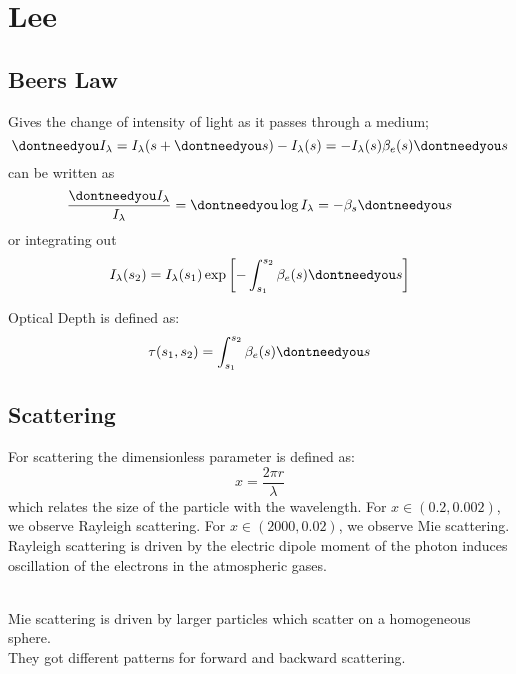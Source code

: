 \documentclass[12pt, a4paper]{article} %
\let\d\dontneedyou
\DeclareMathOperator{\d}{d}
\begin{document}
\section{Lee}

\subsection{Beers Law}

Gives the change of intensity of light as it passes through a medium;
\begin{equation*}
	\d I_\lambda = I_\lambda(s + \d s) - I_\lambda(s) = -I_\lambda(s)\beta_e(s) \d s
\end{equation*}
can be written as
\begin{equation*}
	\frac{\d I_\lambda}{I_\lambda} = \d \log I_\lambda = - \beta_s \d s
\end{equation*}
or integrating out
\begin{equation}
	I_\lambda(s_2) = I_\lambda(s_1) \exp\left[- \int_{s_1}^{s_2} \beta_e(s) \d s \right]
\end{equation}

Optical Depth is defined as:
\begin{equation}
    \tau(s_1, s_2) = \int_{s_1}^{s_2} \beta_e(s) \d s
\end{equation}

\subsection{Scattering}

For scattering the dimensionless parameter is defined as:
\begin{equation}
	x = \frac{2\pi r}{\lambda}
\end{equation}
which relates the size of the particle with the wavelength. For $x \in (0.2, 0.002)$, we observe Rayleigh scattering. For $x \in (2000, 0.02)$, we observe Mie scattering. \\

Rayleigh scattering is driven by the electric dipole moment of the photon induces oscillation of the electrons in the atmospheric gases. \\\

Mie scattering is driven by larger particles which scatter on a homogeneous sphere. \\

They got different patterns for forward and backward scattering.

\end{document}
